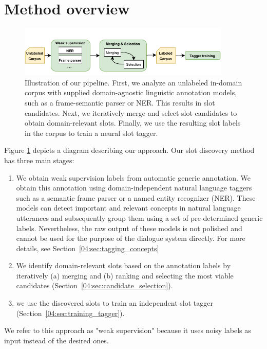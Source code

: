 \section{Method overview}
\label{04:sec:overview}
\begin{figure}[h]
    \centering
    \includegraphics[width=0.9\textwidth]{images/weakly-supervised.pdf}
    \caption{Illustration of our pipeline. First, we analyze an unlabeled in-domain corpus with supplied domain-agnostic linguistic annotation models, such as a frame-semantic parser or NER. This results in slot candidates. Next, we iteratively merge and select slot candidates to obtain domain-relevant slots. Finally, we use the resulting slot labels in the corpus to train a neural slot tagger.}
    \label{fig:discover_overall}
\end{figure}
Figure \ref{fig:discover_overall} depicts a diagram describing our approach.
Our slot discovery method has three main stages:
\begin{enumerate}
    \item We obtain weak supervision labels from automatic generic annotation.
    We obtain this annotation using domain-independent natural language taggers such as a semantic frame parser or a named entity recognizer (NER).
    These models can detect important and relevant concepts in natural language utterances and subsequently group them using a set of pre-determined generic labels.
    Nevertheless, the raw output of these models is not polished and cannot be used for the purpose of the dialogue system directly.
    For more details, see Section~\ref{04:sec:tagging_concepts}
    \item We identify domain-relevant slots based on the annotation labels by iteratively (a) merging and (b) ranking and selecting the most viable candidates (Section~\ref{04:sec:candidate_selection}).
    
    \item we use the discovered slots to train an independent slot tagger (Section~\ref{04:sec:training_tagger}).
\end{enumerate}

We refer to this approach as "weak supervision" because it uses noisy labels as input instead of the desired ones.

